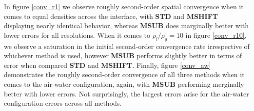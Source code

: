 In figure \ref{conv_r1} we observe roughly second-order spatial convergence when it comes to equal densities across the interface, with \textbf{STD} and \textbf{MSHIFT} displaying nearly identical behavior, whereas \textbf{MSUB} does marginally better with lower errors for all resolutions. When it comes to $\rho_l / \rho_g = 10$ in figure \ref{conv_r10}, we observe a saturation in the initial second-order convergence rate irrespective of whichever method is used, however \textbf{MSUB} performs slightly better in terms of error when compared \textbf{STD} and \textbf{MSHIFT}. Finally, figure \ref{conv_aw} demonstrates the roughly second-order convergence of all three methods when it comes to the air-water configuration, again, with \textbf{MSUB} performing merginally better with lower errors. Not surprisingly, the largest errors arise for the air-water configuration errors across all methods. 



